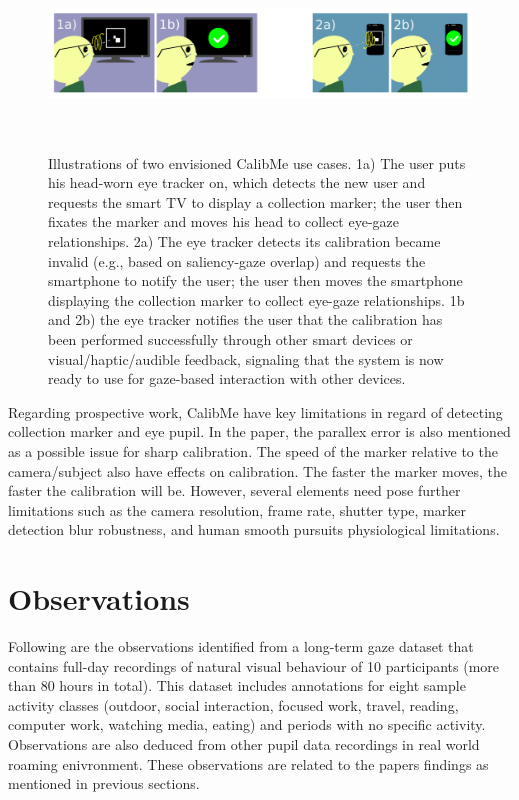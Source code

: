 \begin{figure}[!hbt]
  \centering
  \includegraphics[width=5.5in,height=2in]{calibme.png}
  \caption{Illustrations of two envisioned CalibMe use cases. 1a) The user puts his head-worn eye tracker on, which detects the new user and requests the smart TV to display a collection marker; the user then fixates the marker and moves his head to collect eye-gaze relationships. 2a) The eye tracker detects its calibration became invalid (e.g., based on saliency-gaze overlap) and requests the smartphone to notify the user; the user then moves the smartphone displaying the collection marker to collect eye-gaze relationships. 1b and 2b) the eye tracker notifies the user that the calibration has been performed successfully through other smart devices or visual/haptic/audible feedback, signaling that the system is now ready to use for gaze-based interaction with other devices.}
  \label{calibme}
\end{figure}

Regarding prospective work, CalibMe have key limitations in regard of detecting collection marker and eye pupil. In the paper, the parallex error is also mentioned as a possible issue for sharp calibration. The speed of the marker relative to the camera/subject also have effects on calibration. The faster the marker moves, the faster the calibration will be. However, several elements need pose further limitations such as the camera resolution, frame rate, shutter type, marker detection blur robustness, and human smooth pursuits physiological limitations.

\newpage

\section{Observations}

Following are the observations identified from a long-term gaze dataset \cite{28} that contains full-day recordings of natural visual behaviour of 10 participants (more than 80 hours in total). This dataset includes annotations for eight sample activity classes (outdoor, social interaction, focused work, travel, reading, computer work, watching media, eating) and periods with no specific activity. Observations are also deduced from other pupil data recordings in real world roaming enivronment. These observations are related to the papers findings as mentioned in previous sections.\\

